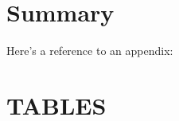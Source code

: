 \documentclass[11pt]{book}\usepackage[]{graphicx}\usepackage[]{color}
\begin{document}
\bigskip


\section{Summary}

Here's a reference to an appendix: %




\clearpage

\section{TABLES}

\end{document}
